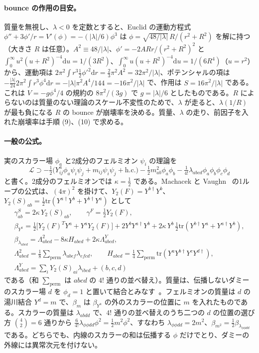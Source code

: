 \documentclass[a4paper,10pt]{ltjsarticle}
\newcommand{\dd}{\mathrm{d}}
\begin{document}
\paragraph{bounce の作用の目安。}質量を無視し、$\lambda<0$ を定数とすると、Euclid の運動方程式 $\phi''+3\phi'/r=V'(\phi)=-(|\lambda|/6)\phi^3$ は $\phi=\sqrt{48/|\lambda|}\,R/(r^2+R^2)$ を解に持つ（大きさ $R$ は任意）。$A^2\equiv48/|\lambda|$、$\phi'=-2ARr/(r^2+R^2)^2$ と $\int_0^\infty u^2(u+R^2)^{-4}\dd u=1/(3R^2)$、$\int_0^\infty u(u+R^2)^{-4}\dd u=1/(6R^4)$（$u=r^2$）から、運動項は $2\pi^2\int r^3\frac12\phi'^2\dd r=\frac23\pi^2A^2=32\pi^2/|\lambda|$、ポテンシャルの項は $-\frac{|\lambda|}{24}2\pi^2\int r^3\phi^4\dd r=-|\lambda|\pi^2A^4/144=-16\pi^2/|\lambda|$ で、作用は $S=16\pi^2/|\lambda|$ である。これは $V=-g\phi^4/4$ の規約の $8\pi^2/(3g)$ で $g=|\lambda|/6$ としたものである。$R$ によらないのは質量のない理論のスケール不変性のためで、$\lambda$ が走ると、$\lambda(1/R)$ が最も負になる $R$ の bounce が崩壊率を決める。質量、$\lambda$ の走り、前因子を入れた崩壊率は手順 (9)、(10) で求める。

\paragraph{一般の公式。}実のスカラー場 $\phi_a$ と2成分のフェルミオン $\psi_i$ の理論を
\begin{equation*}
\mathcal L\supset-\tfrac12\bigl(Y^a_{ij}\phi_a\psi_i\psi_j+m_{ij}\psi_i\psi_j+\mathrm{h.c.}\bigr)-\tfrac12m^2_{ab}\phi_a\phi_b-\tfrac{1}{4!}\lambda_{abcd}\phi_a\phi_b\phi_c\phi_d
\end{equation*}
と書く。2成分のフェルミオンでは $\kappa=\frac12$ である。Machacek と Vaughn~\cite{mv1,mv2,mv3} の1ループの公式は、$(4\pi)^2$ を掛けて、$Y_2(F)=Y^{b\dagger}Y^b$、$Y_2(S)_{ab}=\frac12\mathrm{tr}(Y^{a\dagger}Y^b+Y^{b\dagger}Y^a)$ として
\begin{gather*}
\gamma^S_{ab}=2\kappa\,Y_2(S)_{ab},\qquad\gamma^F=\tfrac12Y_2(F),\\
\beta_{Y^a}=\tfrac12\bigl[Y_2(F)^TY^a+Y^aY_2(F)\bigr]+2Y^bY^{a\dagger}Y^b+2\kappa\,Y^b\,\tfrac12\mathrm{tr}(Y^{b\dagger}Y^a+Y^{a\dagger}Y^b),\\
\beta_{\lambda_{abcd}}=\Lambda^2_{abcd}-8\kappa H_{abcd}+2\kappa\Lambda^Y_{abcd},\\
\Lambda^2_{abcd}=\tfrac18\sum_{\mathrm{perm}}\lambda_{abef}\lambda_{efcd},\qquad
H_{abcd}=\tfrac14\sum_{\mathrm{perm}}\mathrm{tr}(Y^aY^{b\dagger}Y^cY^{d\dagger}),\\
\Lambda^Y_{abcd}=\sum_iY_2(S)_{ai}\lambda_{ibcd}+(b,c,d)
\end{gather*}
である（和 $\sum_{\mathrm{perm}}$ は $abcd$ の $4!$ 通りの並べ替え）。質量は、伝播しないダミーのスカラー場 $d$ を $\phi_d=1$ と置いて結合とみなす~\cite{luo}。フェルミオンの質量は $d$ の湯川結合 $Y^d=m$ で、$\beta_m$ は $\beta_{Y^a}$ の外のスカラーの位置に $m$ を入れたものである。スカラーの質量は $\lambda_{abdd}$ で、$4!$ 通りの並べ替えのうち二つの $d$ の位置の選び方 $\binom42=6$ 通りから $\frac{6}{4!}\lambda_{\phi\phi dd}\phi^2=\frac12m^2\phi^2$、すなわち $\lambda_{\phi\phi dd}=2m^2$、$\beta_{m^2}=\frac12\beta_{\lambda_{\phi\phi dd}}$ である。どちらでも、内線のスカラーの和は伝播する $\phi$ だけでとり、ダミーの外線には異常次元を付けない。
\end{document}
